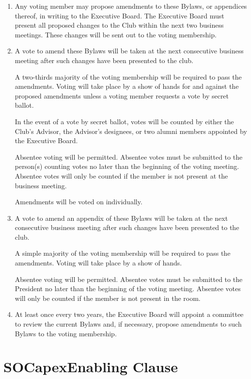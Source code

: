 \documentclass[12pt,letterpaper]{book}
\begin{document}
\begin{enumerate}

\item Any voting member may propose amendments to these Bylaws, or appendices thereof, in writing to the Executive Board. The Executive Board must present all proposed changes to the Club within the next two business meetings. These changes will be sent out to the voting membership.
\item A vote to amend these Bylaws will be taken at the next consecutive business meeting after such changes have been presented to the club.

\subitem A two-thirds majority of the voting membership will be required to pass the amendments. Voting will take place by a show of hands for and against the proposed amendments unless a voting member requests a vote by secret ballot.

\subitem In the event of a vote by secret ballot, votes will be counted by either the Club’s Advisor, the Advisor’s designees, or two alumni members appointed by the Executive Board.

\subitem Absentee voting will be permitted. Absentee votes must be submitted to the person(s) counting votes no later than the beginning of the voting meeting. Absentee votes will only be counted if the member is not present at the business meeting.

\subitem Amendments will be voted on individually.

\item A vote to amend an appendix of these Bylaws will be taken at the next consecutive business meeting after such changes have been presented to the club.

\subitem A simple majority of the voting membership will be required to pass the amendments. Voting will take place by a show of hands.

\subitem Absentee voting will be permitted. Absentee votes must be submitted to the President no later than the beginning of the voting meeting. Absentee votes will only be counted if the member is not present in the room.

\item At least once every two years, the Executive Board will appoint a committee to review the current Bylaws and, if necessary, propose amendments to such Bylaws to the voting membership.

\end{enumerate}

\chapter{SOCapexEnabling Clause}
\end{document}
